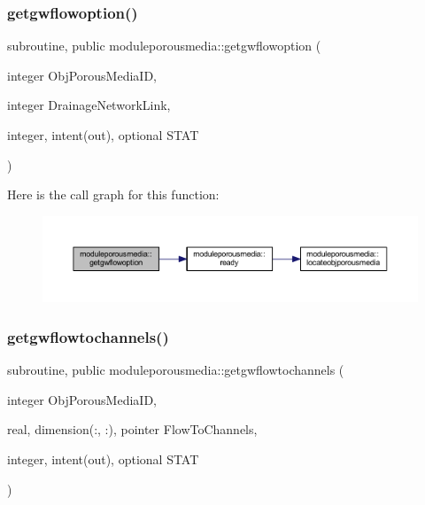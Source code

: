 \subsubsection{\texorpdfstring{getgwflowoption()}{getgwflowoption()}}
{\footnotesize\ttfamily subroutine, public moduleporousmedia\+::getgwflowoption (\begin{DoxyParamCaption}\item[{integer}]{Obj\+Porous\+Media\+ID,  }\item[{integer}]{Drainage\+Network\+Link,  }\item[{integer, intent(out), optional}]{S\+T\+AT }\end{DoxyParamCaption})}

Here is the call graph for this function\+:\nopagebreak
\begin{figure}[H]
\begin{center}
\leavevmode
\includegraphics[width=350pt]{namespacemoduleporousmedia_a959d8f66b0c720fa0d26da43495843eb_cgraph}
\end{center}
\end{figure}
\mbox{\label{namespacemoduleporousmedia_a59f51d54f2a02220e661022657f0435a}} 
\subsubsection{\texorpdfstring{getgwflowtochannels()}{getgwflowtochannels()}}
{\footnotesize\ttfamily subroutine, public moduleporousmedia\+::getgwflowtochannels (\begin{DoxyParamCaption}\item[{integer}]{Obj\+Porous\+Media\+ID,  }\item[{real, dimension(\+:, \+:), pointer}]{Flow\+To\+Channels,  }\item[{integer, intent(out), optional}]{S\+T\+AT }\end{DoxyParamCaption})}

